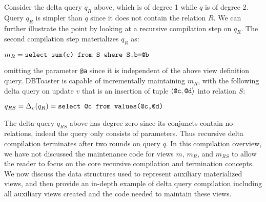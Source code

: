 Consider the delta query $q_R$ above, which is of degree 1 while $q$ is of
degree 2. Query $q_R$ is simpler than $q$ since it does not contain the relation
$R$. We can further illustrate the point by looking at a recursive compilation
step on $q_R$. The second compilation step materializes $q_R$ as:

\vspace{1mm}
$m_R = \mbox{{\tt select sum(c) from S where S.b=@b}}$

\vspace{1mm}
\noindent omitting the parameter {\tt @a} since it is independent of the above
view definition query. DBToaster is capable of incrementally maintaining $m_R$,
with the following delta query on update
$v$ that is an insertion of tuple ${\langle\mbox{{\tt @c}},\mbox{{\tt @d}}\rangle}$ into relation $S$:

\vspace{1mm}
$q_{RS} = \Delta_v(q_R) = \mbox{\tt select @c from values(@c,@d)}$

\vspace{1mm}
\noindent The delta query $q_{RS}$ above has degree zero since its conjuncts
contain no relations, indeed the query only consists of parameters. Thus
recursive delta compilation terminates after two rounds on query $q$.
In this compilation overview, we have not discussed the maintenance code for
views $m$, $m_R$, and $m_{RS}$ to allow the reader to focus on the core recursive
compilation and termination concepts. We now discuss the data structures used to
represent auxiliary materialized views, and then provide an in-depth example of
delta query compilation including all auxiliary views created and the code
needed to maintain these views.


